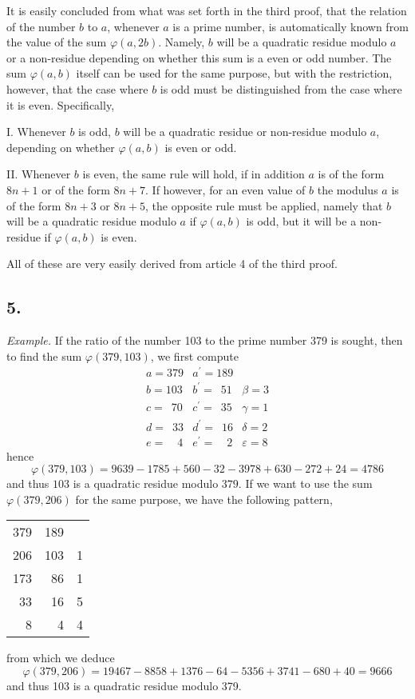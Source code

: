\documentclass[twoside,12pt]{memoir}
\begin{document}
It is easily concluded from what was set forth in the third proof, that the relation of the number \(b\) to \(a\), whenever \(a\) is a prime number, is automatically known from the value of the sum \(\varphi(a, 2 b)\). Namely, \(b\) will be a quadratic residue modulo \(a\) or a non-residue depending on whether this sum is a even or odd number.  The sum \(\varphi(a, b)\) itself can be used for the same purpose, but with the restriction, however, that the case where \(b\) is odd must be distinguished from the case where it is even. Specifically,
 
I. Whenever \(b\) is odd, \(b\) will be a quadratic residue or non-residue modulo \(a\), depending on whether \(\varphi(a, b)\) is even or odd.
 
II. Whenever \(b\) is even, the same rule will hold, if in addition \(a\) is of the form \(8n+1\) or of the form \(8n+7\).  If however, for an even value of \(b\) the modulus \(a\) is of the form \(8n+3\) or \(8n+5\), the opposite rule must be applied, namely that \(b\) will be a quadratic residue modulo \(a\) if \(\varphi(a, b)\) is odd, but it will be a non-residue if \(\varphi(a, b)\) is even.
 
All of these are very easily derived from article 4 of the third proof.
%

\subsection*{5.}

\textit{Example.} If the ratio of the number 103 to the prime number 379 is sought, then to find the sum \(\varphi(379,103)\), we first compute
\[\begin{array}{r|r|r}
a= 379 & a^{\prime}=189 & \\
b= 103 & b^{\prime}=\phantom{0}51 & \beta=3 \\
c= \phantom{0}70 & c^{\prime}=\phantom{0}35 & \gamma=1 \\
d= \phantom{0}33 & d^{\prime}=\phantom{0}16 & \delta=2 \\
e= \phantom{00}4 & e^{\prime}=\phantom{00}2 & \varepsilon=8
\end{array}\]
hence
\[\varphi(379,103)=9639-1785+560-32-3978+630-272+24=4786\]
and thus \(103\) is a quadratic residue modulo \(379\). If we want to use the sum \(\varphi(379,206)\) for the same purpose, we have the following pattern,
\begin{center}
\begin{tabular}{r|r|r}
379 & 189 &  \\
206 & 103 & 1 \\
173 & 86 & 1 \\
33 & 16 & 5 \\
8 & 4 & 4 \\
\end{tabular}
\end{center}
from which we deduce
\[\varphi(379,206)=19467-8858+1376-64-5356+3741-680+40=9666\]
and thus 103 is a quadratic residue modulo 379.
%
\end{document}
